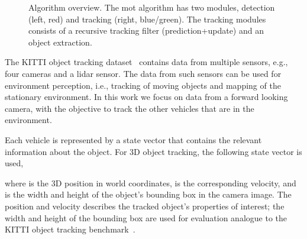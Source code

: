 \documentclass[conference]{IEEEtran}
\begin{document}
\begin{figure}[t]
    \centering



     \caption{Algorithm overview. The \gls{mot} algorithm has two modules, detection (left, red) and tracking (right, blue/green). The tracking modules consists of a recursive tracking filter (prediction+update) and an object extraction.}
    \label{fig:system}
\end{figure}

The KITTI object tracking dataset~\cite{Geiger2012CVPR} contains data from multiple sensors, e.g., four cameras and a lidar sensor. The data from such sensors can be used for environment perception, i.e., tracking of moving objects and mapping of the stationary environment. In this work we focus on data from a forward looking camera, with the objective to track the other vehicles that are in the environment.

Each vehicle is represented by a state vector  that contains the relevant information about the object. For 3D object tracking, the following state vector is used,

where  is the 3D position in world coordinates,  is the corresponding velocity, and  is the width and height of the object's bounding box in the camera image. The position and velocity describes the tracked object's properties of interest; the width and height of the bounding box are used for evaluation analogue to the KITTI object tracking benchmark~\cite{Geiger2012CVPR}.
\end{document}
